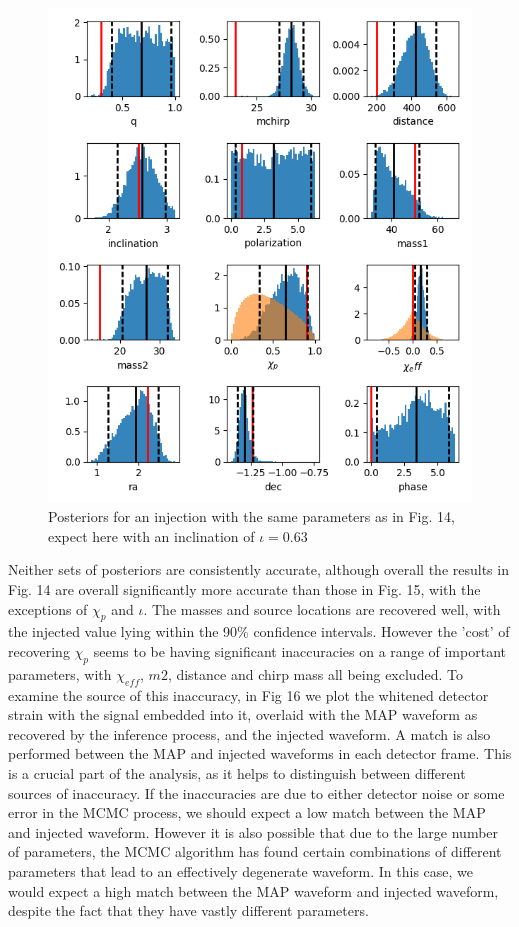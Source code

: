 \documentclass[11pt]{article}
\begin{document}
\begin{figure}[h]
	\includegraphics[scale=1]{fig15.png}
	\centering
	\caption{Posteriors for an injection with the same parameters as in Fig. 14, expect here with an inclination of $\iota=0.63$}
	\centering
\end{figure}
Neither sets of posteriors are consistently accurate, although overall the results in Fig. 14 are overall significantly more accurate than those in Fig. 15, with the exceptions of $\chi_p$ and $\iota$. The masses and source locations are recovered well, with the injected value lying within the 90\% confidence intervals. However the 'cost' of recovering $\chi_p$ seems to be having significant inaccuracies on a range of important parameters, with $\chi_{eff}$, $m2$, distance and chirp mass all being excluded. To examine the source of this inaccuracy, in Fig 16 we plot the whitened detector strain with the signal embedded into it, overlaid with the MAP waveform as recovered by the inference process, and the injected waveform. A match is also performed between the MAP and injected waveforms in each detector frame. This is a crucial part of the analysis, as it helps to distinguish between different sources of inaccuracy. If the inaccuracies are due to either detector noise or some error in the MCMC process, we should expect a low match between the MAP and injected waveform. However it is also possible that due to the large number of parameters, the MCMC algorithm has found certain combinations of different parameters that lead to an effectively degenerate waveform. In this case, we would expect a high match between the MAP waveform and injected waveform, despite the fact that they have vastly different parameters.
\end{document}
